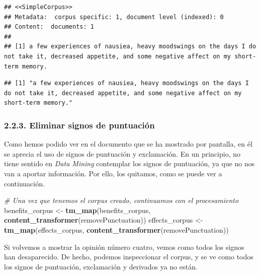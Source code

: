 \documentclass[spanish,]{article}
\newenvironment{Shaded}{\begin{snugshade}}{\end{snugshade}}
\newcommand{\CommentTok}[1]{\textcolor[rgb]{0.56,0.35,0.01}{\textit{#1}}}
\newcommand{\DecValTok}[1]{\textcolor[rgb]{0.00,0.00,0.81}{#1}}
\newcommand{\KeywordTok}[1]{\textcolor[rgb]{0.13,0.29,0.53}{\textbf{#1}}}
\newcommand{\NormalTok}[1]{#1}
\newcommand{\OperatorTok}[1]{\textcolor[rgb]{0.81,0.36,0.00}{\textbf{#1}}}
\newcommand{\StringTok}[1]{\textcolor[rgb]{0.31,0.60,0.02}{#1}}
\begin{document}
\begin{verbatim}
## <<SimpleCorpus>>
## Metadata:  corpus specific: 1, document level (indexed): 0
## Content:  documents: 1
## 
## [1] a few experiences of nausiea, heavy moodswings on the days I do not take it, decreased appetite, and some negative affect on my short-term memory.
\end{verbatim}

\begin{Shaded}
\end{Shaded}

\begin{verbatim}
## [1] "a few experiences of nausiea, heavy moodswings on the days I do not take it, decreased appetite, and some negative affect on my short-term memory."
\end{verbatim}

\hypertarget{eliminar-signos-de-puntuacion}{%
\subsubsection{2.2.3. Eliminar signos de
puntuación}\label{eliminar-signos-de-puntuacion}}

Como hemos podido ver en el documento que se ha mostrado por pantalla,
en él se aprecia el uso de signos de puntuación y exclamación. En un
principio, no tiene sentido en \textit{Data Mining} contemplar los
signos de puntuación, ya que no nos van a aportar información. Por ello,
los quitamos, como se puede ver a continuación.

\begin{Shaded}
\begin{Highlighting}[]
\CommentTok{# Una vez que tenemos el corpus creado, continuamos con el procesamiento}
\NormalTok{benefits_corpus <-}\StringTok{ }\KeywordTok{tm_map}\NormalTok{(benefits_corpus, }\KeywordTok{content_transformer}\NormalTok{(removePunctuation))}
\NormalTok{effects_corpus <-}\StringTok{ }\KeywordTok{tm_map}\NormalTok{(effects_corpus, }\KeywordTok{content_transformer}\NormalTok{(removePunctuation))}
\end{Highlighting}
\end{Shaded}

Si volvemos a mostrar la opinión número cuatro, vemos como todos los
signos han desaparecido. De hecho, podemos inspeccionar el corpus, y se
ve como todos los signos de puntuación, exclamación y derivados ya no
están.
\end{document}

